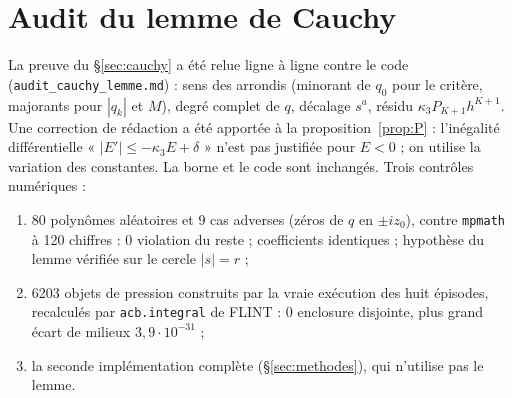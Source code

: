 \documentclass[11pt,a4paper]{article}
\theoremstyle{remark}
\begin{document}
\section{Audit du lemme de Cauchy}\label{sec:audit}
La preuve du §\ref{sec:cauchy} a été relue ligne à ligne contre le code (\texttt{audit\_cauchy\_lemme.md}) : sens des arrondis (minorant de $q_0$ pour le critère, majorants pour $|q_k|$ et $M$), degré complet de $q$, décalage $s^a$, résidu $\kappa_3P_{K+1}h^{K+1}$. Une correction de rédaction a été apportée à la proposition~\ref{prop:P} : l'inégalité différentielle « $|E'|\le-\kappa_3E+\delta$ » n'est pas justifiée pour $E<0$ ; on utilise la variation des constantes. La borne et le code sont inchangés. Trois contrôles numériques :
\begin{enumerate}[nosep]
\item 80 polynômes aléatoires et 9 cas adverses (zéros de $q$ en $\pm iz_0$), contre \texttt{mpmath} à 120 chiffres : 0 violation du reste ; coefficients identiques ; hypothèse du lemme vérifiée sur le cercle $|s|=r$ ;
\item 6203 objets de pression construits par la vraie exécution des huit épisodes, recalculés par \texttt{acb.integral} de FLINT : 0 enclosure disjointe, plus grand écart de milieux $3{,}9\cdot10^{-31}$ ;
\item la seconde implémentation complète (§\ref{sec:methodes}), qui n'utilise pas le lemme.
\end{enumerate}
\end{document}
